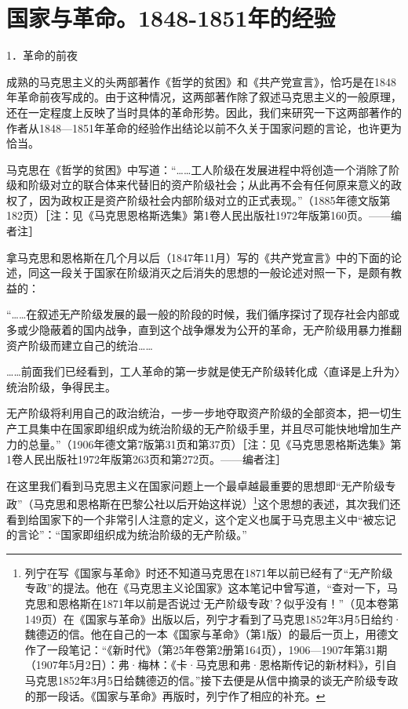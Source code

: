 \documentclass[UTF8, 12pt, a4paper]{ctexrep}
\begin{document}
\chapter{国家与革命。1848-1851年的经验}

1．革命的前夜

成熟的马克思主义的头两部著作《哲学的贫困》和《共产党宣言》，恰巧是在1848年革命前夜写成的。由于这种情况，这两部著作除了叙述马克思主义的一般原理，还在一定程度上反映了当时具体的革命形势。因此，我们来研究一下这两部著作的作者从1848—1851年革命的经验作出结论以前不久关于国家问题的言论，也许更为恰当。

马克思在《哲学的贫困》中写道：“……工人阶级在发展进程中将创造一个消除了阶级和阶级对立的联合体来代替旧的资产阶级社会；从此再不会有任何原来意义的政权了，因为政权正是资产阶级社会内部阶级对立的正式表现。”（1885年德文版第182页）［注：见《马克思恩格斯选集》第1卷人民出版社1972年版第160页。——编者注］

拿马克思和恩格斯在几个月以后（1847年11月）写的《共产党宣言》中的下面的论述，同这一段关于国家在阶级消灭之后消失的思想的一般论述对照一下，是颇有教益的：

“……在叙述无产阶级发展的最一般的阶段的时候，我们循序探讨了现存社会内部或多或少隐蔽着的国内战争，直到这个战争爆发为公开的革命，无产阶级用暴力推翻资产阶级而建立自己的统治……

……前面我们已经看到，工人革命的第一步就是使无产阶级转化成〈直译是上升为〉统治阶级，争得民主。

无产阶级将利用自己的政治统治，一步一步地夺取资产阶级的全部资本，把一切生产工具集中在国家即组织成为统治阶级的无产阶级手里，并且尽可能快地增加生产力的总量。”（1906年德文第7版第31页和第37页）［注：见《马克思恩格斯选集》第1卷人民出版社1972年版第263页和第272页。——编者注］

在这里我们看到马克思主义在国家问题上一个最卓越最重要的思想即“无产阶级专政”（马克思和恩格斯在巴黎公社以后开始这样说）\footnote{列宁在写《国家与革命》时还不知道马克思在1871年以前已经有了“无产阶级专政”的提法。他在《马克思主义论国家》这本笔记中曾写道，“查对一下，马克思和恩格斯在1871年以前是否说过‘无产阶级专政’？似乎没有！”（见本卷第149页）在《国家与革命》出版以后，列宁才看到了马克思1852年3月5日给约·魏德迈的信。他在自己的一本《国家与革命》（第1版）的最后一页上，用德文作了一段笔记：“《新时代》（第25年卷第2册第164页），1906—1907年第31期（1907年5月2日）：弗·梅林：《卡·马克思和弗·恩格斯传记的新材料》，引自马克思1852年3月5日给魏德迈的信。”接下去便是从信中摘录的谈无产阶级专政的那一段话。《国家与革命》再版时，列宁作了相应的补充。}这个思想的表述，其次我们还看到给国家下的一个非常引人注意的定义，这个定义也属于马克思主义中“被忘记的言论”：“国家即组织成为统治阶级的无产阶级。”
\end{document}
